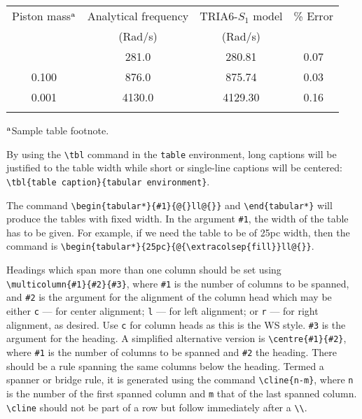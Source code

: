 \begin{table}[t]
{\begin{tabular}{@{}cccc@{}} \toprule
Piston mass$^{\text a}$ & Analytical frequency & TRIA6-$S_1$ model & \% Error \\
& (Rad/s) & (Rad/s) \\ \colrule
1.000 & \hphantom{0}281.0 & \hphantom{0}280.81 & 0.07 \\
0.100 & \hphantom{0}876.0 & \hphantom{0}875.74 & 0.03 \\
0.001 & 4130.0 & 4129.30 & 0.16\\ \botrule
\end{tabular}
}
\begin{tabnote}
$^{\text a}$Sample table footnote.
\end{tabnote}
\label{tbl1.1}
\end{table}

By using the \verb|\tbl| command in the \verb|table| environment, long captions will
be justified to the table width while short or single-line captions
will be centered: \verb|\tbl{table caption}{tabular environment}|.

The command \verb|\begin{tabular*}{#1}{@{}ll@{}}| and \verb|\end{tabular*}|
will produce the tables with fixed width.
In the argument \verb|#1|, the width of the table has to be given.
For example, if we need the table to be of 25pc width, then the command is
\verb|\begin{tabular*}{25pc}{@{\extracolsep{fill}}ll@{}}|.

Headings which span more than one column should be set using
\verb|\multicolumn{#1}{#2}{#3}|, where \verb|#1| is the number of
columns to be spanned, and \verb|#2| is the argument for the alignment
of the column head which may be either \verb|c| --- for center
alignment; \verb|l| --- for left alignment; or \verb|r| --- for right
alignment, as desired. Use \verb|c| for column heads as
this is the WS style. \verb|#3| is the argument for the heading. A simplified
alternative version is \verb|\centre{#1}{#2}|, where \verb|#1| is
the number of columns to be spanned and \verb|#2| the heading.
There should be a rule spanning the same columns below the
heading. Termed a spanner or bridge rule, it is generated using
the command \verb|\cline{n-m}|, where \verb|n| is the number of the
first spanned column and \verb|m| that of the last spanned column.
\verb|\cline| should not be part of a row but follow immediately
after a \verb|\\|.

